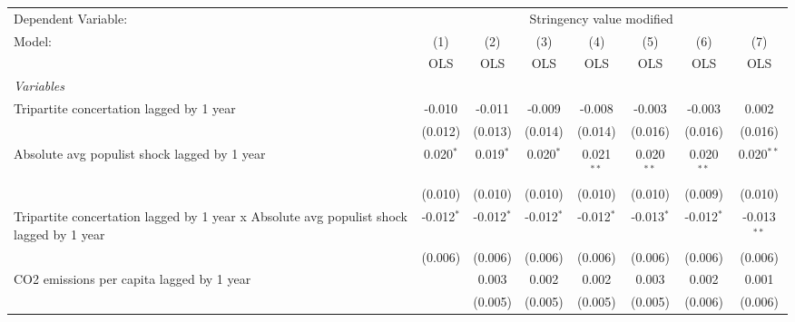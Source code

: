 
\begingroup
\centering
\begin{tabular}{lccccccc}
   \toprule
   Dependent Variable: & \multicolumn{7}{c}{Stringency value modified}\\
   Model:                                                                                  & (1)          & (2)          & (3)          & (4)          & (5)          & (6)          & (7)\\  
                                                                                           &  OLS         & OLS          & OLS          & OLS          & OLS          & OLS          & OLS\\  
   \midrule
   \emph{Variables}\\
   Tripartite concertation lagged by 1 year                                                & -0.010       & -0.011       & -0.009       & -0.008       & -0.003       & -0.003       & 0.002\\   
                                                                                           & (0.012)      & (0.013)      & (0.014)      & (0.014)      & (0.016)      & (0.016)      & (0.016)\\   
   Absolute avg populist shock lagged by 1 year                                            & 0.020$^{*}$  & 0.019$^{*}$  & 0.020$^{*}$  & 0.021$^{**}$ & 0.020$^{**}$ & 0.020$^{**}$ & 0.020$^{**}$\\   
                                                                                           & (0.010)      & (0.010)      & (0.010)      & (0.010)      & (0.010)      & (0.009)      & (0.010)\\   
   Tripartite concertation lagged by 1 year x Absolute avg populist shock lagged by 1 year & -0.012$^{*}$ & -0.012$^{*}$ & -0.012$^{*}$ & -0.012$^{*}$ & -0.013$^{*}$ & -0.012$^{*}$ & -0.013$^{**}$\\   
                                                                                           & (0.006)      & (0.006)      & (0.006)      & (0.006)      & (0.006)      & (0.006)      & (0.006)\\   
   CO2 emissions per capita lagged by 1 year                                               &              & 0.003        & 0.002        & 0.002        & 0.003        & 0.002        & 0.001\\   
                                                                                           &              & (0.005)      & (0.005)      & (0.005)      & (0.005)      & (0.006)      & (0.006)\\   

\end{tabular}
